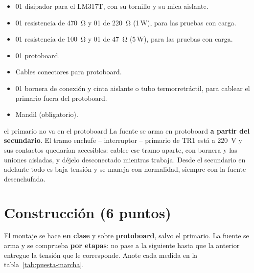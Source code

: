 \documentclass[11pt,a4paper]{article}
\newcommand{\puntos}[1]{\normalfont\normalsize\textmd{(#1 puntos)}}
\begin{document}
\begin{itemize}
    \item 01 disipador para el LM317T, con su tornillo y su mica aislante.
    \item 01 resistencia de \qty{470}{\ohm} y 01 de \qty{220}{\ohm}
          (1\,\unit{\watt}), para las pruebas con carga.
    \item 01 resistencia de \qty{100}{\ohm} y 01 de \qty{47}{\ohm}
          (5\,\unit{\watt}), para las pruebas con carga.
    \item 01 protoboard.
    \item Cables conectores para protoboard.
    \item 01 bornera de conexión y cinta aislante o tubo termorretráctil, para cablear
          el primario fuera del protoboard.
    \item Mandil (obligatorio).
\end{itemize}

\begin{seguridad}{el primario no va en el protoboard}
La fuente se arma en protoboard \textbf{a partir del secundario}. El tramo enchufe --
interruptor -- primario de TR1 está a \qty{220}{\volt} y sus contactos quedarían
accesibles: cablee ese tramo aparte, con bornera y las uniones aisladas, y déjelo
desconectado mientras trabaja. Desde el secundario en adelante todo es baja tensión y se
maneja con normalidad, siempre con la fuente desenchufada.
\end{seguridad}

\FloatBarrier
\section{Construcción \puntos{6}}
El montaje se hace \textbf{en clase} y sobre \textbf{protoboard}, salvo el primario. La
fuente se arma y se comprueba \textbf{por etapas}: no pase a la siguiente hasta que la
anterior entregue la tensión que le corresponde. Anote cada medida en la
tabla~\ref{tab:puesta-marcha}.
\end{document}
